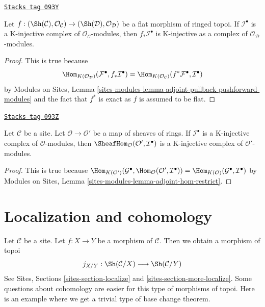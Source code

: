 \begin{lemma}
\label{sites-cohomology-lemma-K-injective-flat}
\href{https://stacks.math.columbia.edu/tag/093Y}{\texttt{Stacks tag 093Y}}

Let $f : (\Sh(\mathcal{C}), \mathcal{O}_\mathcal{C}) \to
(\Sh(\mathcal{D}), \mathcal{O}_\mathcal{D})$ be a flat morphism
of ringed topoi. If $\mathcal{I}^\bullet$ is a K-injective
complex of $\mathcal{O}_\mathcal{C}$-modules, then
$f_*\mathcal{I}^\bullet$ is K-injective
as a complex of $\mathcal{O}_\mathcal{D}$-modules.
\end{lemma}

\begin{proof}
This is true because
$$
\Hom_{K(\mathcal{O}_\mathcal{D})}(\mathcal{F}^\bullet, f_*\mathcal{I}^\bullet)
=
\Hom_{K(\mathcal{O}_\mathcal{C})}(f^*\mathcal{F}^\bullet, \mathcal{I}^\bullet)
$$
by
Modules on Sites, Lemma
\ref{sites-modules-lemma-adjoint-pullback-pushforward-modules}
and the fact that $f^*$ is exact as $f$ is assumed to be flat.
\end{proof}

\begin{lemma}
\label{sites-cohomology-lemma-hom-K-injective}
\href{https://stacks.math.columbia.edu/tag/093Z}{\texttt{Stacks tag 093Z}}

Let $\mathcal{C}$ be a site. Let $\mathcal{O} \to \mathcal{O}'$ be a map
of sheaves of rings. If $\mathcal{I}^\bullet$ is a K-injective complex of
$\mathcal{O}$-modules, then
$\SheafHom_\mathcal{O}(\mathcal{O}', \mathcal{I}^\bullet)$
is a K-injective complex of $\mathcal{O}'$-modules.
\end{lemma}

\begin{proof}
This is true because
$\Hom_{K(\mathcal{O}')}(\mathcal{G}^\bullet,
\Hom_\mathcal{O}(\mathcal{O}', \mathcal{I}^\bullet)) =
\Hom_{K(\mathcal{O})}(\mathcal{G}^\bullet, \mathcal{I}^\bullet)$
by Modules on Sites, Lemma \ref{sites-modules-lemma-adjoint-hom-restrict}.
\end{proof}

\section{Localization and cohomology}
\label{sites-cohomology-section-localization}
Let $\mathcal{C}$ be a site. Let $f : X \to Y$ be a morphism of $\mathcal{C}$.
Then we obtain a morphism of topoi
$$
j_{X/Y} : \Sh(\mathcal{C}/X) \longrightarrow \Sh(\mathcal{C}/Y)
$$
See Sites, Sections \ref{sites-section-localize} and
\ref{sites-section-more-localize}. Some questions about
cohomology are easier for this type of morphisms of topoi.
Here is an example where we get a trivial type of base change theorem.

